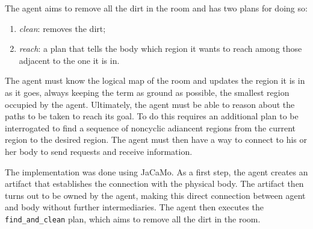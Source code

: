 The agent aims to remove all the dirt in the room and has two plans for doing so:
\begin{enumerate}
    \item \textit{clean}: removes the dirt;
    \item \textit{reach}: a plan that tells the body which region it wants to reach among those adjacent to the one it is in.
\end{enumerate}
The agent must know the logical map of the room and updates the region it is in as it goes, always keeping the term as ground as possible, the smallest region occupied by the agent.
Ultimately, the agent must be able to reason about the paths to be taken to reach its goal.
To do this requires an additional plan to be interrogated to find a sequence of noncyclic adiancent regions from the current region to the desired region.
The agent must then have a way to connect to his or her body to send requests and receive information.

The implementation was done using JaCaMo.
As a first step, the agent creates an artifact that establishes the connection with the physical body.
The artifact then turns out to be owned by the agent, making this direct connection between agent and body without further intermediaries.
The agent then executes the \texttt{find\_and\_clean} plan, which aims to remove all the dirt in the room. 

